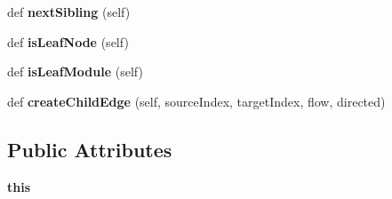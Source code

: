 \begin{DoxyCompactItemize}
\mbox{\label{classinfomap_1_1ChildIterator_a6a60e6bf913675bcca9b8749d2daccea}} 
def {\bfseries next\+Sibling} (self)
\item 
\mbox{\label{classinfomap_1_1ChildIterator_aa5573b6805868febea2b720759f3fdcf}} 
def {\bfseries is\+Leaf\+Node} (self)
\item 
\mbox{\label{classinfomap_1_1ChildIterator_a192e85949b283192165edbc3698ef2f5}} 
def {\bfseries is\+Leaf\+Module} (self)
\item 
\mbox{\label{classinfomap_1_1ChildIterator_a20d78d484fea384a3a4448ee372268dd}} 
def {\bfseries create\+Child\+Edge} (self, source\+Index, target\+Index, flow, directed)
\end{DoxyCompactItemize}
\subsection*{Public Attributes}
\begin{DoxyCompactItemize}
\item 
\mbox{\label{classinfomap_1_1ChildIterator_a2c88e8063b2c155da520b4b74bf2e014}} 
{\bfseries this}
\end{DoxyCompactItemize}
